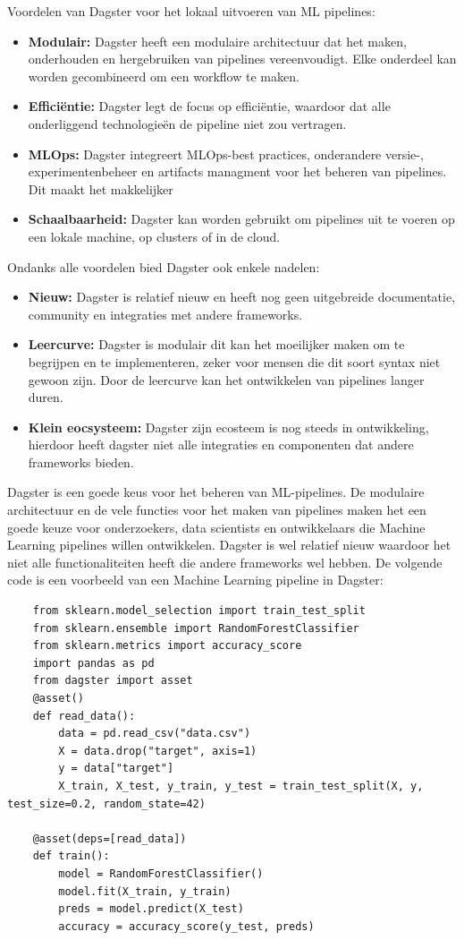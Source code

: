 Voordelen van Dagster voor het lokaal uitvoeren van ML pipelines:
\begin{itemize}
    \item \textbf{Modulair:} Dagster heeft een modulaire architectuur dat het maken, onderhouden en hergebruiken van pipelines vereenvoudigt. Elke onderdeel kan worden gecombineerd om een workflow te maken.
    \item \textbf{Efficiëntie:} Dagster legt de focus op efficiëntie, waardoor dat alle onderliggend technologieën de pipeline niet zou vertragen.
    \item \textbf{MLOps:} Dagster integreert MLOps-best practices, onderandere versie-, experimentenbeheer en artifacts managment voor het beheren van pipelines. Dit maakt het makkelijker 
    \item \textbf{Schaalbaarheid:} Dagster kan worden gebruikt om pipelines uit te voeren op een lokale machine, op clusters of in de cloud.
\end{itemize}
Ondanks alle voordelen bied Dagster ook enkele nadelen:
\begin{itemize}
    \item \textbf{Nieuw:} Dagster is relatief nieuw en heeft nog geen uitgebreide documentatie, community en integraties met andere frameworks.
    \item \textbf{Leercurve:} Dagster is modulair dit kan het moeilijker maken om te begrijpen en te implementeren, zeker voor mensen die dit soort syntax niet gewoon zijn. Door de leercurve kan het ontwikkelen van pipelines langer duren.
    \item \textbf{Klein eocsysteem:} Dagster zijn ecosteem is nog steeds in ontwikkeling, hierdoor heeft dagster niet alle integraties en componenten dat andere frameworks bieden.
\end{itemize}
Dagster is een goede keus voor het beheren van ML-pipelines. De modulaire architectuur en de vele functies voor het maken van pipelines maken het een goede keuze voor onderzoekers, data scientists en ontwikkelaars die Machine Learning pipelines willen ontwikkelen. Dagster is wel relatief nieuw waardoor het niet alle functionaliteiten heeft die andere frameworks wel hebben.
De volgende code is een voorbeeld van een Machine Learning pipeline in Dagster:

\begin{verbatim}
    from sklearn.model_selection import train_test_split
    from sklearn.ensemble import RandomForestClassifier
    from sklearn.metrics import accuracy_score
    import pandas as pd
    from dagster import asset
    @asset()
    def read_data():
        data = pd.read_csv("data.csv")
        X = data.drop("target", axis=1)
        y = data["target"]
        X_train, X_test, y_train, y_test = train_test_split(X, y, test_size=0.2, random_state=42)

    @asset(deps=[read_data])  
    def train():
        model = RandomForestClassifier()
        model.fit(X_train, y_train)
        preds = model.predict(X_test)
        accuracy = accuracy_score(y_test, preds)
\end{verbatim}

